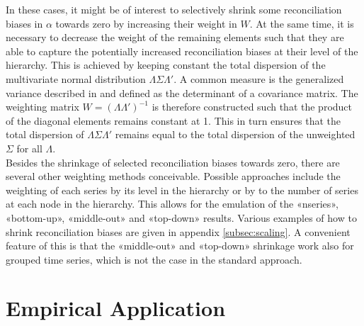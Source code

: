 \documentclass[a4paper,fleqn,11pt]{article}
\begin{document}
In these cases, it might be of interest to selectively shrink some reconciliation biases in $\alpha$ towards zero by increasing their weight in $W$. At the same time, it is necessary to decrease the weight of the remaining elements such that they are able to capture the potentially increased reconciliation biases at their level of the hierarchy. This is achieved by keeping constant the total dispersion of the  multivariate normal distribution $\Lambda\Sigma\Lambda'$. A common measure is the generalized variance described in \cite{Mustonen1997} and defined as the determinant of a covariance matrix. The weighting matrix $W = (\Lambda\Lambda')^{-1}$ is therefore constructed such that the product of the diagonal elements remains constant at 1. This in turn ensures that the total dispersion of $\Lambda\Sigma\Lambda'$ remains equal to the total dispersion of the unweighted $\Sigma$ for all $\Lambda$.\\

Besides the shrinkage of selected reconciliation biases towards zero, there are several other weighting methods conceivable.  Possible approaches include the weighting of each series by its level in the hierarchy or by to the number of series at each node in the hierarchy. This allows for the emulation of the «nseries», «bottom-up», «middle-out» and «top-down» results. Various examples of how to shrink reconciliation biases are given in appendix \ref{subsec:scaling}. A convenient feature of this is that the «middle-out» and «top-down» shrinkage work also for grouped time series, which is not the case in the standard approach.\\


\clearpage


\section{Empirical Application}
\label{sec:appl}
\end{document}
